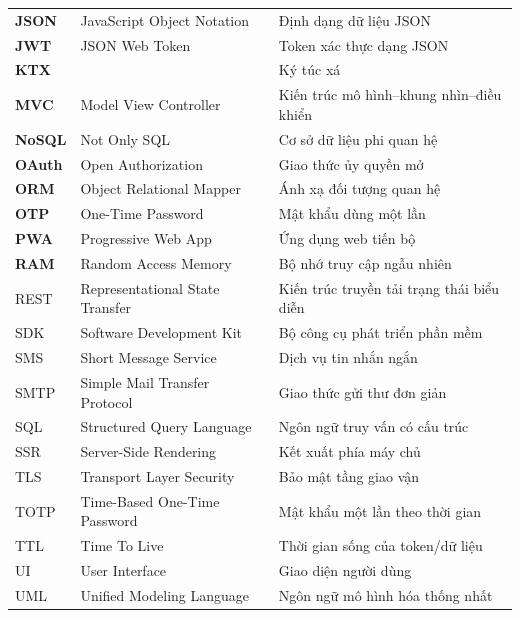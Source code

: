 \documentclass[../DoAn.tex]{subfiles}
\begin{document}
\begin{longtable}{l p{6cm} p{7cm}}
    \textbf{JSON}    & JavaScript Object Notation         & Định dạng dữ liệu JSON \\[3pt]
    \textbf{JWT}     & JSON Web Token                     & Token xác thực dạng JSON \\[3pt]
   \textbf{ KTX}     &                                & Ký túc xá \\[3pt]
   \textbf{ MVC}     & Model View Controller              & Kiến trúc mô hình--khung nhìn--điều khiển \\[3pt]
   \textbf{ NoSQL}   & Not Only SQL                       & Cơ sở dữ liệu phi quan hệ \\[3pt]
   \textbf{ OAuth}   & Open Authorization                 & Giao thức ủy quyền mở \\[3pt]
   \textbf{ ORM}     & Object Relational Mapper           & Ánh xạ đối tượng quan hệ \\[3pt]
   \textbf{ OTP}     & One-Time Password                  & Mật khẩu dùng một lần \\[3pt]
   \textbf{ PWA}     & Progressive Web App                & Ứng dụng web tiến bộ \\[3pt]
    \textbf{RAM}     & Random Access Memory               & Bộ nhớ truy cập ngẫu nhiên \\[3pt]
    REST    & Representational State Transfer     & Kiến trúc truyền tải trạng thái biểu diễn \\[3pt]
    SDK     & Software Development Kit           & Bộ công cụ phát triển phần mềm \\[3pt]
    SMS     & Short Message Service              & Dịch vụ tin nhắn ngắn \\[3pt]
    SMTP    & Simple Mail Transfer Protocol      & Giao thức gửi thư đơn giản \\[3pt]
    SQL     & Structured Query Language          & Ngôn ngữ truy vấn có cấu trúc \\[3pt]
    SSR     & Server-Side Rendering              & Kết xuất phía máy chủ \\[3pt]
    TLS     & Transport Layer Security           & Bảo mật tầng giao vận \\[3pt]
    TOTP    & Time-Based One-Time Password       & Mật khẩu một lần theo thời gian \\[3pt]
    TTL     & Time To Live                       & Thời gian sống của token/dữ liệu \\[3pt]
    UI      & User Interface                     & Giao diện người dùng \\[3pt]
    UML     & Unified Modeling Language          & Ngôn ngữ mô hình hóa thống nhất \\[3pt]

\end{longtable}
\end{document}
